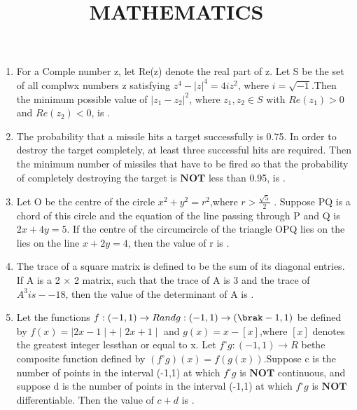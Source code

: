 \documentclass{article}
\begin{document}
\begin{enumerate}
\title{\centerline{\textbf{MATHEMATICS \\}}}
\author{}
\date{}

\item For a Comple number z, let Re(z) denote the real part of z. Let S be the set of all complwx numbers z satisfying $z^4 - |z|^4 = 4iz^2$, where $i = \sqrt{-1}$.Then the minimum possible value of $|z_1 - z_2|^2$, where $z_1,z_2 \in S$ with $Re(z_1)>0$ and $ Re(z_2)<0 $, is \underline{\hspace{2cm}}.

\item The probability that a missile hits a target successfully is 0.75. In order to destroy the target 
completely, at least three successful hits are required. Then the minimum number of missiles that
have to be fired so that the probability of completely destroying the target is $\textbf{NOT}$ less than 0.95, is \underline{\hspace{2cm}}.

\item Let O be the centre of the circle $x^2 + y^2 = r^2$,where $r>\frac{\sqrt{5}}{2}$
. Suppose PQ is a chord of this circle and the equation of the line passing through P and Q is $2x + 4y = 5$. If the centre of the circumcircle of the triangle OPQ lies on the lies on the line $x + 2y = 4$, then the value of r is \underline{\hspace{2cm}}.

\item The trace of a square matrix is defined to be the sum of its diagonal entries. If A is a 2 $\times$ 2 matrix, such that the trace of A is 3 and the trace of $A^3 is --18$, then the value of the determinant of A is \underline{\hspace{2cm}}.

\item Let the functions $f : (-1,1) \to R and g : (-1,1) \to (\brak-1,1)$ be defined by
 $f(x) = \mid2x - 1\mid + \mid2x + 1\mid$ and $g(x) = x - [x]$,where $[x]$ denotes the greatest integer lessthan or equal to x. Let $f ^\circ g: (-1,1) \to R$ bethe composite function defined by $(f ^\circ g)(x) = f(g(x))$.Suppose c is the number of points in the interval (-1,1) at which $f ^\circ g$ is $\textbf {NOT}$ continuous, and suppose d is the number of points in the interval (-1,1) at which $f ^\circ g$ is $\textbf{NOT}$ differentiable. Then the value of $c + d$ is \underline{\hspace{2cm}}.


\end{enumerate}
\end{document}
